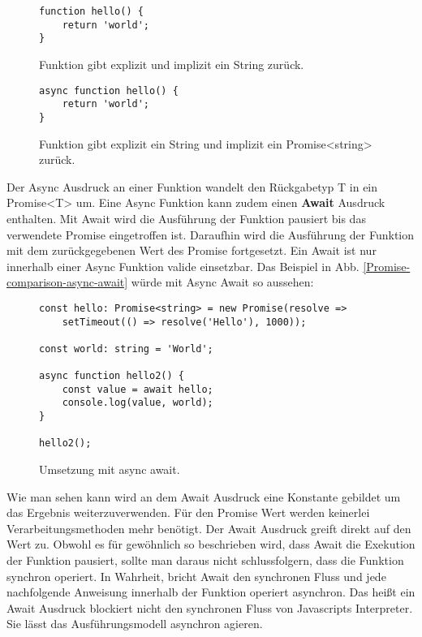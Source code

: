 \begin{figure}[H]
\begin{lstlisting}[basicstyle=\small]
function hello() {
    return 'world';
}
\end{lstlisting}
\caption{Funktion gibt explizit und implizit ein String zurück.}
\end{figure}

\begin{figure}[H]
\begin{lstlisting}[basicstyle=\small]
async function hello() {
    return 'world';
}
\end{lstlisting}
\caption{Funktion gibt explizit ein String und implizit ein Promise\textless string\textgreater{} zurück.}
\end{figure}

\noindent
Der Async Ausdruck an einer Funktion wandelt den Rückgabetyp T in ein Promise\textless T\textgreater{} um. Eine Async Funktion kann zudem einen \textbf{Await} Ausdruck enthalten. Mit Await wird die Ausführung der Funktion pausiert bis das verwendete Promise eingetroffen ist. Daraufhin wird die Ausführung der Funktion mit dem zurückgegebenen Wert des Promise fortgesetzt. Ein Await ist nur innerhalb einer Async Funktion valide einsetzbar. Das Beispiel in Abb. \ref{Promise-comparison-async-await} würde mit Async Await so aussehen:

\begin{figure}[H]
\begin{lstlisting}[basicstyle=\small]
const hello: Promise<string> = new Promise(resolve =>
    setTimeout(() => resolve('Hello'), 1000));
    
const world: string = 'World';

async function hello2() {
    const value = await hello;
    console.log(value, world);
}

hello2();
\end{lstlisting}
\caption{Umsetzung mit async await.}
\end{figure}

\noindent
Wie man sehen kann wird an dem Await Ausdruck eine Konstante gebildet um das Ergebnis weiterzuverwenden. Für den Promise Wert werden keinerlei Verarbeitungsmethoden mehr benötigt. Der Await Ausdruck greift direkt auf den Wert zu. Obwohl es für gewöhnlich so beschrieben wird, dass Await die Exekution der Funktion pausiert, sollte man daraus nicht schlussfolgern, dass die Funktion synchron operiert. In Wahrheit, bricht Await den synchronen Fluss und jede nachfolgende Anweisung innerhalb der Funktion operiert asynchron. Das heißt ein Await Ausdruck blockiert nicht den synchronen Fluss von Javascripts Interpreter. Sie lässt das Ausführungsmodell asynchron agieren.

